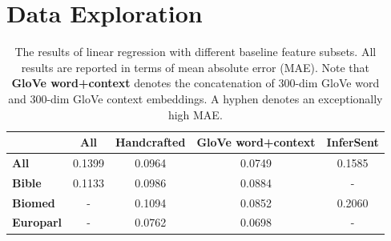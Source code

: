 \documentclass{dcthesis}
\theoremstyle{definition}
\theoremstyle{remark}
\begin{document}
\chapter{Data Exploration}

\begin{table}[]
    \centering
    \begin{tabular}{l|c|c|c|c}
    \toprule
     & \textbf{All} & \textbf{Handcrafted} & \textbf{GloVe word+context} & \textbf{InferSent} \\
    \midrule
    \textbf{All} & 0.1399 & 0.0964 & 0.0749 & 0.1585 \\
    \textbf{Bible} & 0.1133 & 0.0986 & 0.0884 & - \\
    \textbf{Biomed} & - & 0.1094 & 0.0852 & 0.2060 \\
    \textbf{Europarl} & - & 0.0762 & 0.0698 & - \\
    \bottomrule
    \end{tabular}
    \caption{\label{tab:baseline_systems} The results of linear regression with different baseline feature subsets. All results are reported in terms of mean absolute error (MAE). Note that \textbf{GloVe word+context} denotes the concatenation of 300-dim GloVe word and 300-dim GloVe context embeddings. A hyphen denotes an exceptionally high MAE.}
\end{table}
\end{document}
